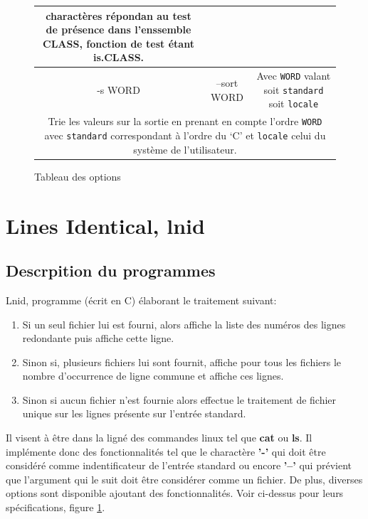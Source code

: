 \documentclass[12pt]{article}
\begin{document}
\begin{figure}[H]
\begin{tabular}{|c|c|c|}
{{                charactères répondan au test  de présence dans l'enssemble 
                CLASS, fonction de test étant is.CLASS.}}\\[.8em]
            \hline
                \cellcolor{blue-s!25} -s WORD & \cellcolor{blue-s!25} --sort 
                WORD & \cellcolor{blue-t!70}Avec \texttt{WORD} valant
                 soit \texttt{standard} soit \texttt{locale} \\
            \hline
                \multicolumn{3}{|c|}{\cellcolor{blue-u!7}\rule{0pt}{2em}
                \parbox{15cm}{{Trie les valeurs sur la sortie en prenant en 
                compte l'ordre \texttt{WORD} avec \texttt{standard}} 
                correspondant à l'ordre du  `C' et \texttt{locale} celui du 
                système de l'utilisateur.}}\\[1em]
            \hline
        \end{tabular}
        \caption{Tableau des options}\label{table-opt}
    \end{figure}

    \newpage

    \section{Lines Identical, lnid}

    \subsection{Descrpition du programmes}

    Lnid, programme (écrit en C) élaborant le traitement suivant:
    \begin{enumerate}
        \item[] Si un seul fichier lui est fourni, alors affiche la liste 
        des numéros des lignes redondante puis affiche cette ligne.
        \item[] Sinon si, plusieurs fichiers lui sont fournit, affiche pour
         tous les fichiers le nombre d'occurrence de ligne commune et 
         affiche ces lignes.
        \item[] Sinon si aucun fichier n'est fournie alors effectue le 
        traitement de fichier unique sur les lignes présente sur l'entrée 
        standard.
    \end{enumerate}

    Il visent à être dans la ligné des commandes linux tel que \textbf{cat} ou 
    \textbf{ls}. Il implémente donc des fonctionnalités tel que le charactère 
    \textbf{'-'} qui doit être considéré comme indentificateur de l'entrée 
    standard ou encore \textbf{'--'} qui prévient que l'argument qui le suit 
    doit être considérer comme un fichier. De plus, diverses options sont 
    disponible ajoutant des fonctionnalités. Voir ci-dessus pour leurs 
    spécifications, figure \ref{table-opt}.
\end{document}
